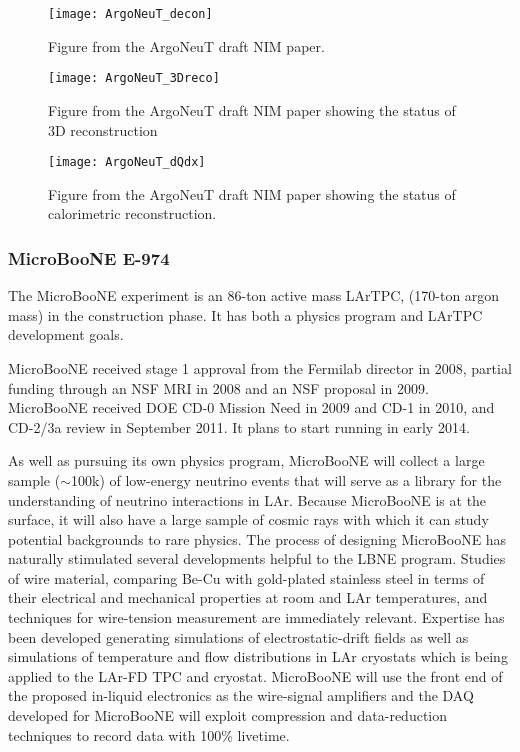 \begin{figure}
\centering 
{\texttt{[image: ArgoNeuT\_decon]}}
\caption[Data from ArgoNeuT]{Figure from the ArgoNeuT draft NIM paper. } %
\label{Argo-decon}
\end{figure}

\begin{figure}
\centering 
{\texttt{[image: ArgoNeuT\_3Dreco]}}
\caption[ArgoNeuT: status of 3D reconstruction]{Figure from the ArgoNeuT draft NIM paper showing the status of 3D reconstruction} %
\label{ArgoNeuT_3Dreco}
\end{figure}

\begin{figure}
\centering 
\texttt{[image: ArgoNeuT\_dQdx]}
\caption[ArgoNeuT: status of calorimetric reconstruction]{Figure from the ArgoNeuT draft NIM paper showing the status of calorimetric reconstruction. } %
\label{ArgoNeuT-calorimetry}
\end{figure}

\subsubsection {MicroBooNE E-974}

The MicroBooNE experiment is an 86-ton active mass LArTPC, (170-ton argon mass) in the construction phase.  It has both a physics program and LArTPC development goals.  

MicroBooNE received stage 1 approval from the Fermilab director in 2008, partial funding through an NSF MRI in 2008 and an NSF proposal in 2009.  MicroBooNE received  DOE CD-0 Mission Need in 2009 and CD-1 in 2010, and CD-2/3a review in September 2011. It plans to start running in early 2014. 

As well as pursuing its own physics program, MicroBooNE will collect a large sample ($\sim$100k) of low-energy neutrino events that will serve as a library for the understanding of neutrino interactions in 
LAr. Because MicroBooNE is at the surface, it will also have a large sample of cosmic rays with which it can study potential backgrounds to rare physics. The process of designing MicroBooNE has naturally stimulated several developments helpful to the LBNE program.  Studies of wire material, comparing Be-Cu with gold-plated stainless steel in terms of their electrical and mechanical properties at room and LAr temperatures, and techniques for wire-tension measurement are immediately relevant. Expertise has been developed generating simulations of electrostatic-drift fields as well as simulations of temperature and flow distributions in LAr cryostats which is being applied to the LAr-FD TPC and cryostat. MicroBooNE will  use the front end of the proposed in-liquid electronics as the wire-signal amplifiers and the DAQ developed for MicroBooNE will exploit compression and data-reduction techniques to record data with 100\% livetime.

